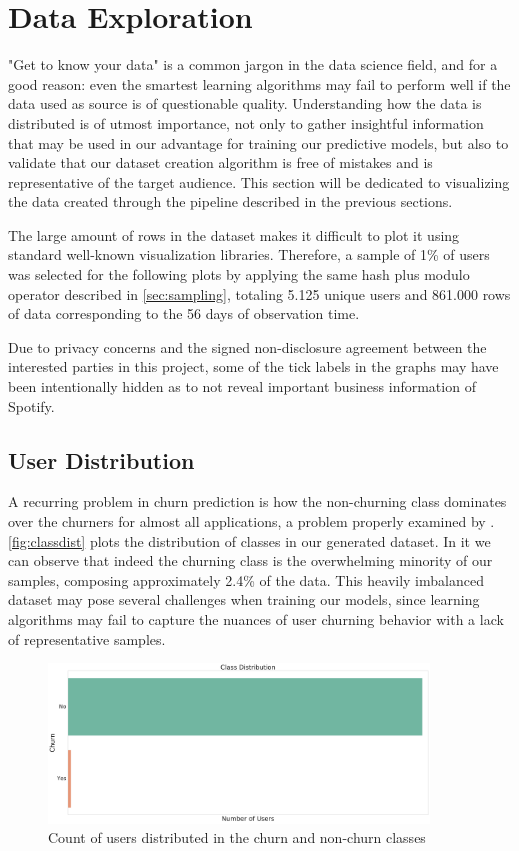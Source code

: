 \documentclass{kththesis}
\begin{document}
\section{Data Exploration}

"Get to know your data" is a common jargon in the data science field, and for a good reason: even the smartest learning algorithms may fail to perform well if the data used as source is of questionable quality. Understanding how the data is distributed is of utmost importance, not only to gather insightful information that may be used in our advantage for training our predictive models, but also to validate that our dataset creation algorithm is free of mistakes and is representative of the target audience. This section will be dedicated to visualizing the data created through the pipeline described in the previous sections.

The large amount of rows in the dataset makes it difficult to plot it using standard well-known visualization libraries. Therefore, a sample of 1\% of users was selected for the following plots by applying the same hash plus modulo operator described in \autoref{sec:sampling}, totaling 5.125 unique users and 861.000 rows of data corresponding to the 56 days of observation time.

Due to privacy concerns and the signed non-disclosure agreement between the interested parties in this project, some of the tick labels in the graphs may have been intentionally hidden as to not reveal important business information of Spotify.

\subsection{User Distribution}

A recurring problem in churn prediction is how the non-churning class dominates over the churners for almost all applications, a problem properly examined by \citep{Burez2009}. \autoref{fig:classdist} plots the distribution of classes in our generated dataset. In it we can observe that indeed the churning class is the overwhelming minority of our samples, composing approximately 2.4\% of the data. This heavily imbalanced dataset may pose several challenges when training our models, since learning algorithms may fail to capture the nuances of user churning behavior with a lack of representative samples.

	\begin{figure}[H]
    \centering
    \includegraphics[width=0.9\textwidth,height=0.9\textheight,keepaspectratio]{figures/class_dist.pdf}
    \caption{Count of users distributed in the churn and non-churn classes}
    \label{fig:classdist}
	\end{figure}
\end{document}
